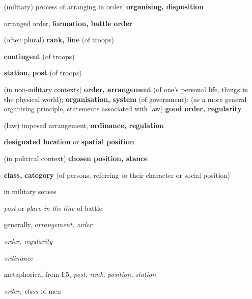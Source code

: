 \begin{compactdesc}
					\item[CGL 1358a, PDF 1398] \phantom{.}
						\begin{compactitem}
							\item[1] (military) process of arranging in order, \textbf{organising, disposition}
							\item[2] arranged order, \textbf{formation, battle order}
							\item[3] (often plural) \textbf{rank, line} (of troops)
							\item[4] \textbf{contingent} (of troops)
							\item[5] \textbf{station, post} (of troops)
							\item[6] (in non-military contexts) \textbf{order, arrangement} (of one's personal life, things in the physical world); \textbf{organisation, system} (of government); (as a more general organising principle, statements associated with law) \textbf{good order, regularity}
							\item[7] (law) imposed arrangement, \textbf{ordinance, regulation}
							\item[8] \textbf{designated location} or \textbf{spatial position}
							\item[9] (in political context) \textbf{chosen position, stance}
							\item[10] \textbf{class, category} (of persons, referring to their character or social position)
						\end{compactitem}
						
					\item[LSJ 1756b, PDF 1827] \phantom{.}
						\begin{compactitem}
							\item[I] in military senses
							\item[I.5] \textit{post} or \textit{place in the line} of battle
							\item[II.1] generally, \textit{arrangement, order}
							\item[II.2] \textit{order, regularity}
							\item[II.3] \textit{ordinance}
							\item[III] metaphorical from I.5, \textit{post, rank, position, station}
							\item[IV.1] \textit{order, class} of men
						\end{compactitem}
						

\end{compactdesc}
